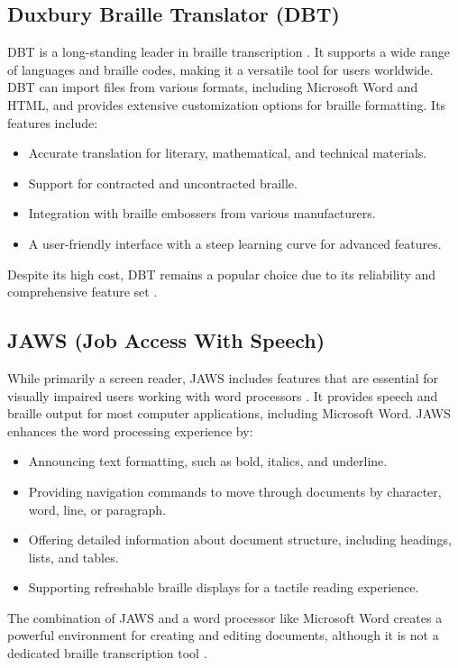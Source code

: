 \subsection{Duxbury Braille Translator (DBT)}\label{ch12:ssec:dbt}
DBT is a long-standing leader in braille transcription \supercite{Duxbury, DBTWebsite, VisionAidDBT}. It supports a wide range of languages and braille codes, making it a versatile tool for users worldwide. DBT can import files from various formats, including Microsoft Word and HTML, and provides extensive customization options for braille formatting. Its features include:
\begin{itemize}
	\item Accurate translation for literary, mathematical, and technical materials.
	\item Support for contracted and uncontracted braille.
	\item Integration with braille embossers from various manufacturers.
	\item A user-friendly interface with a steep learning curve for advanced features.
\end{itemize}
Despite its high cost, DBT remains a popular choice due to its reliability and comprehensive feature set \supercite{DBTPricing, DuxburySystems}.

\subsection{JAWS (Job Access With Speech)}\label{ch12:ssec:jaws}
While primarily a screen reader, JAWS includes features that are essential for visually impaired users working with word processors \supercite{FreedomScientificJAWS, JAWSFeatures}. It provides speech and braille output for most computer applications, including Microsoft Word. JAWS enhances the word processing experience by:
\begin{itemize}
	\item Announcing text formatting, such as bold, italics, and underline.
	\item Providing \gls{navigation} commands to move through documents by character, word, line, or paragraph.
	\item Offering detailed information about document structure, including headings, lists, and tables.
	\item Supporting refreshable braille displays for a tactile reading experience.
\end{itemize}
The combination of JAWS and a word processor like Microsoft Word creates a powerful environment for creating and editing documents, although it is not a dedicated braille transcription tool \supercite{JAWSRequirements}.


